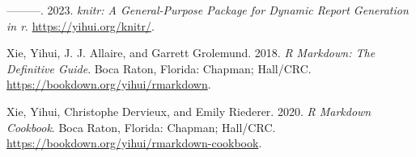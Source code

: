 \documentclass[
  letterpaper,
  DIV=11,
  numbers=noendperiod]{scrartcl}
\newlength{\cslhangindent}
\newenvironment{CSLReferences}[2] %
 {\begin{list}{}{%
  \setlength{\itemindent}{0pt}
  \setlength{\leftmargin}{0pt}
  \setlength{\parsep}{0pt}
  \ifodd #1
   \setlength{\leftmargin}{\cslhangindent}
   \setlength{\itemindent}{-1\cslhangindent}
  \fi
  \setlength{\itemsep}{#2\baselineskip}}}
 {\end{list}}
\begin{document}
\begin{CSLReferences}{1}{0}
---------. 2023. \emph{{knitr}: A General-Purpose Package for Dynamic
Report Generation in r}. \url{https://yihui.org/knitr/}.

Xie, Yihui, J. J. Allaire, and Garrett Grolemund. 2018. \emph{R
Markdown: The Definitive Guide}. Boca Raton, Florida: Chapman; Hall/CRC.
\url{https://bookdown.org/yihui/rmarkdown}.

Xie, Yihui, Christophe Dervieux, and Emily Riederer. 2020. \emph{R
Markdown Cookbook}. Boca Raton, Florida: Chapman; Hall/CRC.
\url{https://bookdown.org/yihui/rmarkdown-cookbook}.

\end{CSLReferences}
\end{document}
